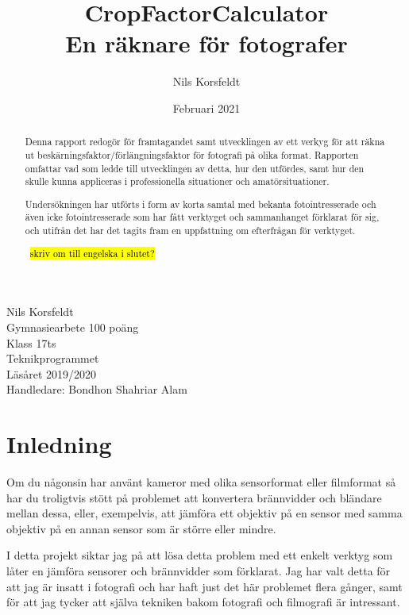 \documentclass[11pt]{article}
\title{%
        CropFactorCalculator\\
        \large En räknare för fotografer}
\author{Nils Korsfeldt}
\date{Februari 2021}
\begin{document}
\maketitle

{\raggedleft\vfill{%
    Nils Korsfeldt \\ 
    Gymnasiearbete 100 poäng \\
    Klass 17ts \\
    Teknikprogrammet \\
    Läsåret 2019/2020 \\
    Handledare: Bondhon Shahriar Alam
}\par
}

\clearpage

\begin{abstract}
\normalsize
Denna rapport redogör för framtagandet samt utvecklingen av ett verkyg för att
räkna ut beskärningsfaktor/förlängningsfaktor för fotografi på olika format.
Rapporten omfattar vad som ledde till utvecklingen av detta, hur den utfördes,
samt hur den skulle kunna appliceras i professionella situationer och
amatörsituationer.\par

Undersökningen har utförts i form av korta samtal med bekanta fotointresserade
och även icke fotointresserade som har fått verktyget och sammanhanget
förklarat för sig, och utifrån det har det tagits fram en uppfattning om
efterfrågan för verktyget.\par
\bigskip
\textuparrow \ \hl{skriv om till engelska i slutet?}

\end{abstract}

\clearpage

\renewcommand{\contentsname}{Innehållsförteckning}
\tableofcontents

\clearpage

\section{Inledning}
\sloppy
Om du någonsin har använt kameror med olika sensorformat eller filmformat så
har du troligtvis stött på problemet att konvertera brännvidder och bländare
mellan dessa, eller, exempelvis, att jämföra ett objektiv på en sensor med
samma objektiv på en annan sensor som är större eller mindre.\par
\fussy

I detta projekt siktar jag på att lösa detta problem med ett enkelt verktyg som
låter en jämföra sensorer och brännvidder som förklarat. Jag har valt detta för
att jag är insatt i fotografi och har haft just det här problemet flera gånger,
samt för att jag tycker att själva tekniken bakom fotografi och filmografi är
intressant.\par
\end{document}
